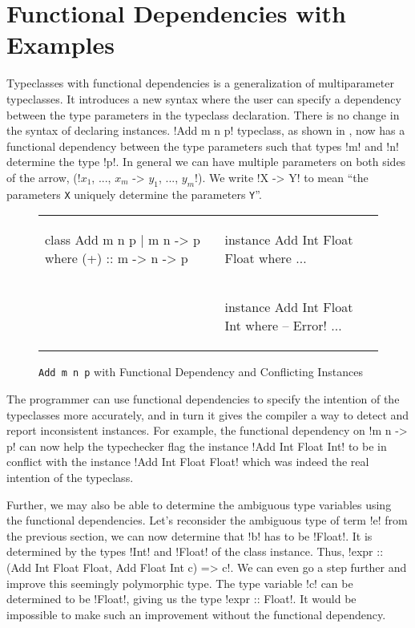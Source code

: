 \documentclass[format=acmsmall,manuscript,review,screen,nonacm,margin=1in,11pt]{acmart}
\begin{document}
\section{Functional Dependencies with Examples}\label{sec:fd}
Typeclasses with functional dependencies\cite{jones_tcfd_2000} is a generalization of multiparameter typeclasses.
It introduces a new syntax where the user can specify a dependency between the type parameters
in the typeclass declaration. There is no change in the syntax of declaring instances.
!Add m n p! typeclass, as shown in , now has a functional dependency
between the type parameters such that types !m! and !n! determine the type !p!.
In general we can have multiple parameters on both sides of the arrow,
(!$x_1$, ..., $x_m$ -> $y_1$, ..., $y_m$!). We write !X -> Y! to mean
``the parameters \texttt{X} uniquely determine the parameters \texttt{Y}''.

\begin{figure}[ht]
  \footnotesize
  \begin{tabular}{l l}
\begin{code}
class Add m n p | m n -> p where
  (+) :: m -> n -> p
\end{code}&%
\begin{code}
instance Add Int Float Float where
  $\ldots$
\end{code}\\
    &
\begin{code}
instance Add Int Float Int where -- Error!
  $\ldots$
\end{code}
  \end{tabular}
  \caption{\texttt{Add m n p} with Functional Dependency and Conflicting Instances}
  \label{fig:add-tc-fd}
\end{figure}

The programmer can use functional dependencies to specify the intention of the typeclasses
more accurately, and in turn it gives the compiler a way to detect and report inconsistent instances.
For example, the functional dependency on !m n -> p!
can now help the typechecker flag the instance !Add Int Float Int! to be in conflict with the instance
!Add Int Float Float! which was indeed the real intention of the typeclass.

Further, we may also be able to determine the ambiguous type variables using the functional dependencies.
Let's reconsider the ambiguous type of term !e! from the previous section, we can now determine
that !b! has to be !Float!. It is determined by the types !Int! and !Float! of the class instance.
Thus, !expr :: (Add Int Float Float, Add Float Int c) => c!.
We can even go a step further and improve this seemingly polymorphic type.
The type variable !c! can be determined to be !Float!, giving us the type !expr :: Float!.
It would be impossible to make such an improvement without the functional dependency.
\end{document}
